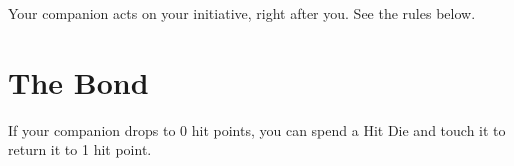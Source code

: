 \documentclass[letterpaper,twoside,twocolumn,openany,nodeprecatedcode,
  style=2024,srd=5.2.1,justified,links=color,index]{dndbook}
\begin{document}
Your companion acts on your initiative, right after you. See the  rules below.

\section{The Bond}\label{sec:bond}
If your companion drops to 0 hit points, you can spend a Hit Die and touch it to return it to 1 hit point.

\DndPrintIndex
\end{document}
